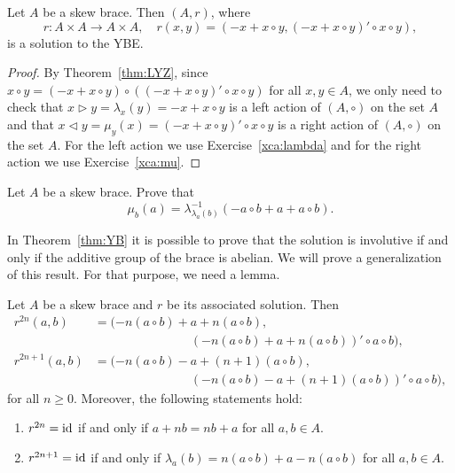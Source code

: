 \begin{theorem}
\label{thm:YB}
Let $A$ be a skew brace. Then 
$(A,r)$, where 
\[
r\colon A\times A\to A\times A,\quad
r(x,y)=( -x+x\circ y,(-x+x\circ y)'\circ x\circ y),
\]
is a solution to the YBE. 
\end{theorem}

\begin{proof}
    By Theorem~\ref{thm:LYZ}, 
    since $x\circ y=(-x+x\circ y)\circ ((-x+x\circ y)'\circ x\circ y)$ for all $x,y\in A$, 
    we only need to check that 
    $x\rhd y=\lambda_x(y)=-x+x\circ y$ 
    is a left action of $(A,\circ)$ on the set $A$ 
    and that $x\lhd y=\mu_y(x)=(-x+x\circ y)'\circ x\circ y$ 
    is a right action of $(A,\circ)$ on the set $A$. For the left action we use 
    Exercise~\ref{xca:lambda} and for the right action we use Exercise~\ref{xca:mu}.
\end{proof}

\begin{exercise}
Let $A$ be a skew brace. 
Prove that 
\[
\mu_b(a)=\lambda^{-1}_{\lambda_a(b)}(-a\circ b+a+a\circ b).
\]
\end{exercise}

In Theorem~\ref{thm:YB} it is possible to prove that the solution 
is involutive if and only if the additive group of the brace is abelian. We will
prove a generalization of this result. For that purpose, we need a lemma. 

\begin{lemma}
\label{lem:|r|}
Let $A$ be a skew brace and $r$ be its associated solution.  Then
  \begin{align} 
  \nonumber
  r^{2n}(a,b)&=(-n(a\circ b)+a+n(a\circ
    b),\\
    \label{eq:r^2n}
    &\phantom{=(-n(a\circ b)+}(-n(a\circ b)+a+n(a\circ b))'\circ a\circ b),\\
  \nonumber
  r^{2n+1}(a,b)&=(-n(a\circ b)-a+(n+1)(a\circ
    b),\\
    \label{eq:r^2n+1}
    &\phantom{=(-n(a\circ b)+}(-n(a\circ b)-a+(n+1)(a\circ b))'\circ a\circ b),
    \end{align} 
    for all $n\geq0$.  Moreover, the following statements hold:
  \begin{enumerate} 
  \item $r^{2n}=\operatorname{id}$ if and only if $a+nb=nb+a$ for all $a,b\in A$.  
      \item $r^{2n+1}=\operatorname{id}$ if and only if $\lambda_a(b)=n(a\circ
	b)+a-n(a\circ b)$ for all $a,b\in A$.  
	\end{enumerate} 
\end{lemma}


